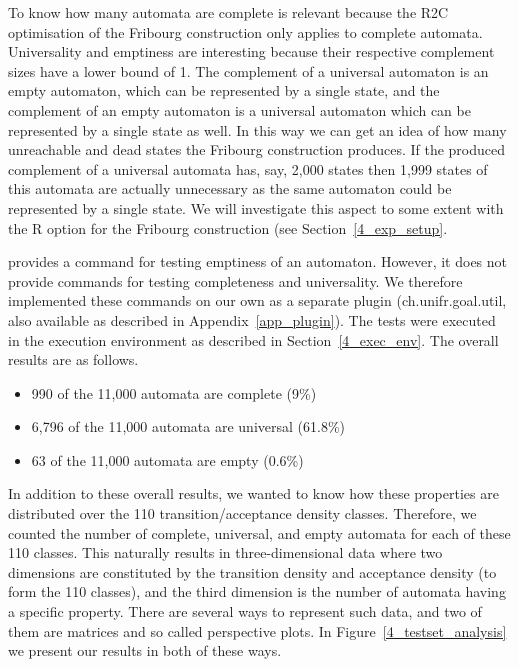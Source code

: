 To know how many automata are complete is relevant because the R2C optimisation of the Fribourg construction only applies to complete automata. Universality and emptiness are interesting because their respective complement sizes have a lower bound of 1. The complement of a universal automaton is an empty automaton, which can be represented by a single state, and the complement of an empty automaton is a universal automaton which can be represented by a single state as well. In this way we can get an idea of how many unreachable and dead states the Fribourg construction produces. If the produced complement of a universal automata has, say, 2,000 states then 1,999 states of this automata are actually unnecessary as the same automaton could be represented by a single state. We will investigate this aspect to some extent with the R option for the Fribourg construction (see Section~\ref{4_exp_setup}.

\goal{} provides a command for testing emptiness of an automaton. However, it does not provide commands for testing completeness and universality. We therefore implemented these commands on our own as a separate \goal{} plugin (\textsf{ch.unifr.goal.util}, also available as described in Appendix~\ref{app_plugin}). The tests were executed in the execution environment as described in Section~\ref{4_exec_env}. The overall results are as follows.

\begin{itemize}
\item 990 of the 11,000 automata are complete (9\%)
\item 6,796 of the 11,000 automata are universal (61.8\%)
\item 63 of the 11,000 automata are empty (0.6\%)
\end{itemize}

In addition to these overall results, we wanted to know how these properties are distributed over the 110 transition/acceptance density classes. Therefore, we counted the number of complete, universal, and empty automata for each of these 110 classes. This naturally results in three-dimensional data where two dimensions are constituted by the transition density and acceptance density (to form the 110 classes), and the third dimension is the number of automata having a specific property. There are several ways to represent such data, and two of them are matrices and so called perspective plots. In Figure~\ref{4_testset_analysis} we present our results in both of these ways. 

